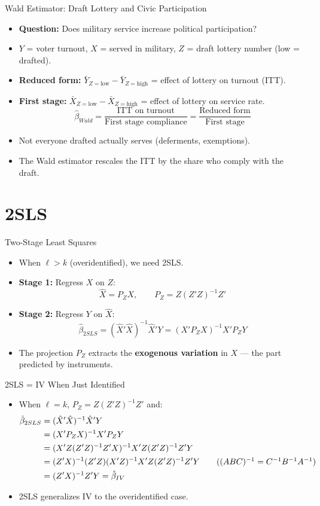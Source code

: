 \documentclass[aspectratio=169, handout]{beamer}
\numberwithin{equation}{section}
\begin{document}
\begin{frame}{Wald Estimator: Draft Lottery and Civic Participation}
\begin{itemize}
\item \textbf{Question:} Does military service increase political participation?
\item $Y$ = voter turnout, $X$ = served in military, $Z$ = draft lottery number (low = drafted).
\item \textbf{Reduced form:} $\bar{Y}_{Z=\text{low}} - \bar{Y}_{Z=\text{high}}$ = effect of lottery on turnout (ITT).
\item \textbf{First stage:} $\bar{X}_{Z=\text{low}} - \bar{X}_{Z=\text{high}}$ = effect of lottery on service rate.
$$\hat{\beta}_{Wald} = \frac{\text{ITT on turnout}}{\text{First stage compliance}} = \frac{\text{Reduced form}}{\text{First stage}}$$
\item Not everyone drafted actually serves (deferments, exemptions).
\item The Wald estimator rescales the ITT by the share who comply with the draft.
\end{itemize}
\end{frame}


\section{2SLS}

\begin{frame}{Two-Stage Least Squares}
\begin{itemize}
\item When $\ell>k$ (overidentified), we need 2SLS.
\item \textbf{Stage 1:}  Regress $X$ on $Z$:
$$\hat{X} = P_Z X, \qquad P_Z = Z(Z'Z)^{-1}Z'$$
\item \textbf{Stage 2:}  Regress $Y$ on $\hat{X}$:
$$\hat{\beta}_{2SLS} = (\hat{X}'\hat{X})^{-1}\hat{X}'Y = (X'P_ZX)^{-1}X'P_ZY$$
\item The projection $P_Z$ extracts the \textbf{exogenous variation} in $X$ --- the part predicted by instruments.
\end{itemize}
\end{frame}


\begin{frame}{2SLS = IV When Just Identified}
\begin{itemize}
\item When $\ell=k$, $P_Z = Z(Z'Z)^{-1}Z'$ and:
\begin{align*}
\hat{\beta}_{2SLS}&=(\hat{X}'\hat{X})^{-1}\hat{X}'Y\\
&=(X'P_ZX)^{-1}X'P_ZY\\
&=(X'Z(Z'Z)^{-1}Z'X)^{-1}X'Z(Z'Z)^{-1}Z'Y\\
&=(Z'X)^{-1}(Z'Z)(X'Z)^{-1}X'Z(Z'Z)^{-1}Z'Y \tag{$(ABC)^{-1}=C^{-1}B^{-1}A^{-1}$}\\
&=(Z'X)^{-1}Z'Y = \hat{\beta}_{IV}
\end{align*}
\item 2SLS generalizes IV to the overidentified case.
\end{itemize}
\end{frame}
\end{document}
